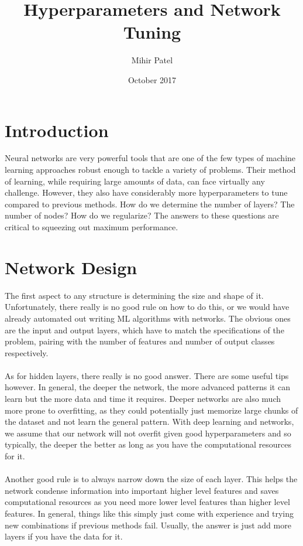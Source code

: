 \documentclass{article}
\title{Hyperparameters and Network Tuning}
\author{Mihir Patel}
\date{October 2017}
\begin{document}
\maketitle

\section{Introduction}
    Neural networks are very powerful tools that are one of the few types of machine learning approaches robust enough to tackle a variety of problems. Their method of learning, while requiring large amounts of data, can face virtually any challenge. However, they also have considerably more hyperparameters to tune compared to previous methods. How do we determine the number of layers? The number of nodes? How do we regularize? The answers to these questions are critical to squeezing out maximum performance.

\section{Network Design}
    The first aspect to any structure is determining the size and shape of it. Unfortunately, there really is no good rule on how to do this, or we would have already automated out writing ML algorithms with networks. The obvious ones are the input and output layers, which have to match the specifications of the problem, pairing with the number of features and number of output classes respectively.
    \\
    \\
    As for hidden layers, there really is no good answer. There are some useful tips however. In general, the deeper the network, the more advanced patterns it can learn but the more data and time it requires. Deeper networks are also much more prone to overfitting, as they could potentially just memorize large chunks of the dataset and not learn the general pattern. With deep learning and networks, we assume that our network will not overfit given good hyperparameters and so typically, the deeper the better as long as you have the computational resources for it. 
    \\
    \\
    Another good rule is to always narrow down the size of each layer. This helps the network condense information into important higher level features and saves computational resources as you need more lower level features than higher level features. In general, things like this simply just come with experience and trying new combinations if previous methods fail. Usually, the answer is just add more layers if you have the data for it.
    
\end{document}
